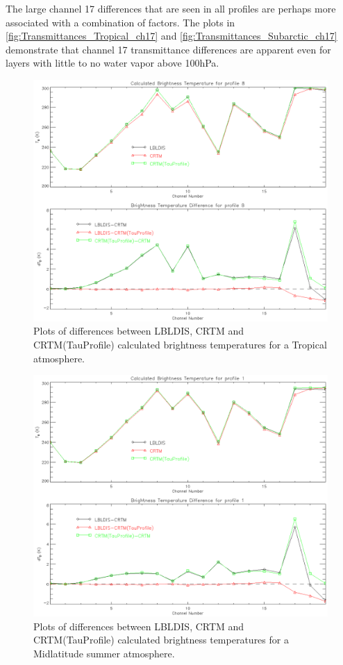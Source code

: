 The large channel 17 differences that are seen in all profiles are perhaps more associated with a combination of factors. The plots in \ref{fig:Transmittances_Tropical_ch17} and \ref{fig:Transmittances_Subarctic_ch17} demonstrate that channel 17 transmittance differences are apparent even for layers with little to no water vapor above 100hPa. 

\begin{figure}[htp]
  \centering{}
  \includegraphics[scale=0.8]{./graphics/Clear_Sky_Comparison_08.eps}
  \caption{Plots of differences between LBLDIS, CRTM and CRTM(TauProfile) calculated brightness temperatures for
   a Tropical atmosphere.}
  \label{fig:Clear_Sky_Tropical}
\end{figure}

\begin{figure}[htp]
  \centering{}
  \includegraphics[scale=0.8]{./graphics/Clear_Sky_Comparison_01.eps}
  \caption{Plots of differences between LBLDIS, CRTM and CRTM(TauProfile) calculated brightness temperatures for
   a Midlatitude summer atmosphere.}
  \label{fig:Clear_Sky_Midlatitude_summer}
\end{figure}

